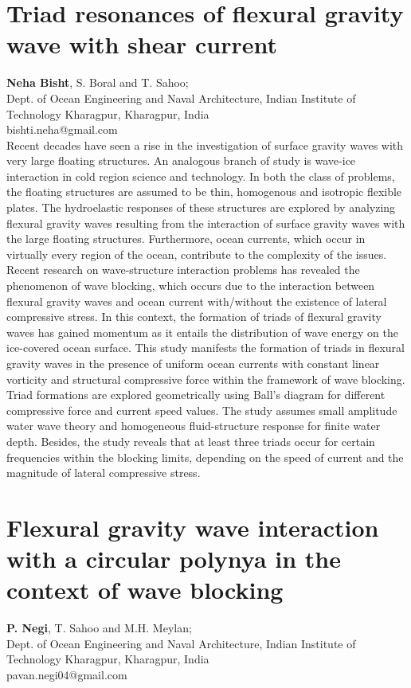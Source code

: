 \documentclass[9pt,a4paper,oneside]{book}
\numberwithin{equation}{section}
\begin{document}
\section*{Triad resonances of flexural gravity wave with shear current}
 \label{abs:16}
  {\bf Neha Bisht}, S. Boral and T. Sahoo;\\
Dept. of Ocean Engineering and Naval Architecture, Indian Institute of Technology Kharagpur, Kharagpur, India\\
bishti.neha@gmail.com\\

Recent decades have seen a rise in the investigation of surface gravity waves with very large floating structures. An analogous branch of study is wave-ice interaction in cold region science and technology. In both the class of problems, the floating structures are assumed to be thin, homogenous and isotropic flexible plates. The hydroelastic responses of these structures are explored by analyzing flexural gravity waves resulting from the interaction of surface gravity waves with the large floating structures. Furthermore, ocean currents, which occur in virtually every region of the ocean, contribute to the complexity of the issues. Recent research on wave-structure interaction problems has revealed the phenomenon of wave blocking, which occurs due to the interaction between flexural gravity waves and ocean current with/without the existence of lateral compressive stress. In this context, the formation of triads of flexural gravity waves has gained momentum as it entails the distribution of wave energy on the ice-covered ocean surface. This study manifests the formation of triads in flexural gravity waves in the presence of uniform ocean currents with constant linear vorticity and structural compressive force within the framework of wave blocking. Triad formations are explored geometrically using Ball's diagram for different compressive force and current speed values. The study assumes small amplitude water wave theory and homogeneous fluid-structure response for finite water depth. Besides, the study reveals that at least three triads occur for certain frequencies within the blocking limits, depending on the speed of current and the magnitude of lateral compressive stress.

\section*{Flexural gravity wave interaction with a circular polynya in the context of wave blocking}
 \label{abs:17}
  {\bf P. Negi}, T. Sahoo and M.H. Meylan;\\
Dept. of Ocean Engineering and Naval Architecture, Indian Institute of Technology Kharagpur, Kharagpur, India\\
pavan.negi04@gmail.com\\
\end{document}
